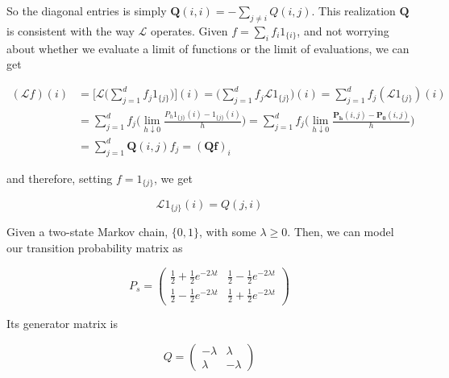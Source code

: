 \begin{example}
		So the diagonal entries is simply $\mathbf{Q}(i, i) = - \sum_{j \neq i} Q(i, j)$. This realization $\mathbf{Q}$ is consistent with the way $\mathscr{L}$ operates. Given $f = \sum_i f_i 1_{\{i\}}$, and not worrying about whether we evaluate a limit of functions or the limit of evaluations, we can get 

		\begin{align*}
			(\mathscr{L} f) (i) & = \bigg[ \mathscr{L} \bigg( \sum_{j=1}^d f_j 1_{\{j\}} \bigg) \bigg] (i) = \bigg( \sum_{j=1}^d f_j \mathscr{L} 1_{\{j\}} \bigg) (i) = \sum_{j=1}^d f_j ( \mathscr{L} 1_{\{j\}}) (i) \\ 
			& = \sum_{j=1}^d f_j \bigg( \lim_{h \downarrow 0} \frac{P_h 1_{\{ j\}} (i) - 1_{\{j\}} (i)}{h} \bigg) = \sum_{j=1}^d f_j \bigg( \lim_{h \downarrow 0} \frac{\mathbf{P_h} (i, j) - \mathbf{P_0} (i, j)}{h} \bigg) \\
			& = \sum_{j=1}^d \mathbf{Q}(i, j) f_j = (\mathbf{Q} \mathbf{f})_i 
		\end{align*}

		and therefore, setting $f = 1_{\{j\}}$, we get 

			\begin{equation}
				\mathscr{L} 1_{\{j\}} (i) = Q(j, i)
			\end{equation}
	\end{example}

	\begin{example}
		\label{ex:two-state-continuous-time-chain}
		Given a two-state Markov chain, $\{0, 1\}$, with some $\lambda \geq 0$. Then, we can model our transition probability matrix as 

			\begin{equation}
				P_s  = \begin{pmatrix} \frac{1}{2} + \frac{1}{2} e^{-2\lambda t} &  \frac{1}{2} - \frac{1}{2} e^{-2\lambda t} \\  \frac{1}{2} - \frac{1}{2} e^{-2\lambda t} &  \frac{1}{2} + \frac{1}{2} e^{-2\lambda t} \end{pmatrix}
			\end{equation}

		Its generator matrix is 

			\begin{equation}
				Q = \begin{pmatrix} -\lambda & \lambda \\ \lambda & -\lambda \end{pmatrix}
			\end{equation}
	\end{example}


